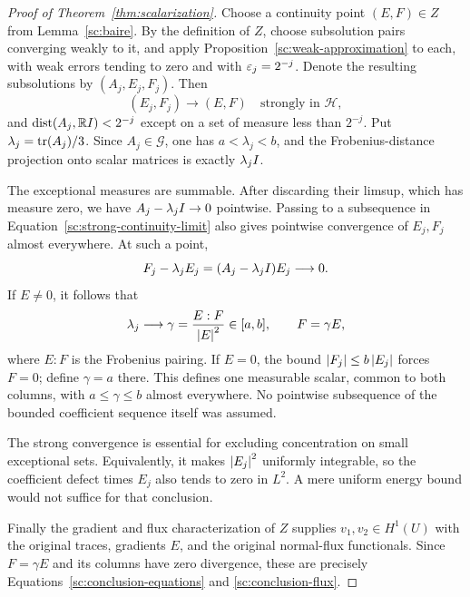 \begin{proof}[Proof of Theorem~\ref{thm:scalarization}]
Choose a continuity point $(E,F)\in Z$ from
Lemma~\ref{sc:baire}. By the definition of $Z$, choose subsolution
pairs converging weakly to it, and apply
Proposition~\ref{sc:weak-approximation} to each, with weak errors
tending to zero and with $\varepsilon_j=2^{-j}$. Denote the resulting
subsolutions by $(A_j,E_j,F_j)$. Then
\begin{equation}
 \label{sc:strong-continuity-limit}
 (E_j,F_j)\longrightarrow(E,F)\quad\text{strongly in }\mathcal H,
\end{equation}
and $\operatorname{dist}(A_j,\mathbb RI)<2^{-j}$ except on a set of measure less
than $2^{-j}$. Put $\lambda_j=\operatorname{tr}(A_j)/3$. Since $A_j\in
\mathcal G$, one has $a<\lambda_j<b$, and the Frobenius-distance
projection onto scalar matrices is exactly $\lambda_jI$.

The exceptional measures are summable. After discarding their
limsup, which has measure zero, we have
$A_j-\lambda_jI\to0$ pointwise. Passing to a subsequence in
Equation~\eqref{sc:strong-continuity-limit} also gives pointwise
convergence of $E_j,F_j$ almost everywhere. At such a point,
\[
 F_j-\lambda_jE_j=(A_j-\lambda_jI)E_j\longrightarrow0.
\]
If $E\ne0$, it follows that
\begin{equation}
 \label{sc:measurable-scalar}
 \lambda_j\longrightarrow\gamma=
       \frac{E:F}{\left\lvert E\right\rvert^2}\in[a,b],\qquad F=\gamma E,
\end{equation}
where $E:F$ is the Frobenius pairing. If $E=0$, the bound
$\left\lvert F_j\right\rvert\leq b\left\lvert E_j\right\rvert$ forces $F=0$; define $\gamma=a$
there. This defines one measurable scalar, common to both columns,
with $a\leq\gamma\leq b$ almost everywhere. No pointwise
subsequence of the bounded coefficient sequence itself was
assumed.

The strong convergence is essential for excluding concentration
on small exceptional sets. Equivalently, it makes $\left\lvert E_j\right\rvert^2$
uniformly integrable, so the coefficient defect times $E_j$
also tends to zero in $L^2$. A mere uniform energy bound would
not suffice for that conclusion.

Finally the gradient and flux characterization of $Z$ supplies
$v_1,v_2\in H^1(U)$ with the original traces, gradients $E$,
and the original normal-flux functionals. Since $F=\gamma E$
and its columns have zero divergence, these are precisely
Equations~\eqref{sc:conclusion-equations} and
\eqref{sc:conclusion-flux}.
\end{proof}
